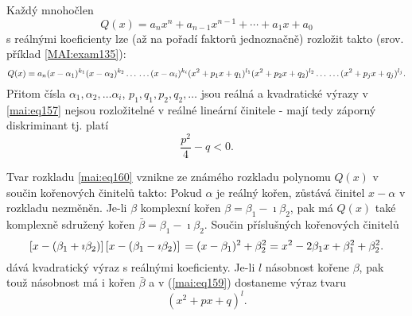       \begin{mdframed}[style=mdmathlemma] 
        \begin{lemma}\label{mai:lemma010}
          Každý mnohočlen
          \begin{equation*}
            Q(x) = a_nx^n + a_{n-1}x^{n-1} + \cdots + a_1x + a_0
          \end{equation*}
          s reálnými koeficienty lze (až na pořadí faktorů jednoznačně) rozložit takto (srov.
          příklad \ref{MAI:exam135}):
          \begin{equation}\label{mai:eq159}
            Q(x) = a_n(x-\alpha_1)^{k_1}(x-\alpha_2)^{k_2}\ldots                   \nonumber \\
            \ldots(x-\alpha_i)^{k_i}(x^2+p_1x+q_1)^{l_1}(x^2+p_2x+q_2)^{l_2}\ldots \nonumber \\ 
            \ldots(x^2+p_jx+q_j)^{l_j}.
          \end{equation}
          Přitom čísla \(\alpha_1, \alpha_2, \ldots \alpha_i\), \(p_1, q_1, p_2, q_2, \ldots \) jsou
          reálná a kvadratické výrazy v \ref{mai:eq157} nejsou rozložitelné v reálné lineární
          činitele - mají tedy záporný diskriminant tj. platí
          \begin{equation}\label{mai:eq160}
            \frac{p^2}{4}-q<0.
          \end{equation} 
        \end{lemma}
      \end{mdframed}

      Tvar rozkladu \ref{mai:eq160} vznikne ze známého rozkladu polynomu \(Q(x)\) v součin
      kořenových činitelů takto: Pokud \(\alpha\) je reálný kořen, zůstává činitel \(x-\alpha\) v
      rozkladu nezměněn. Je-li \(\beta\) komplexní kořen \(\beta = \beta_1-\imath\beta_2\), pak má
      \(Q(x)\) také komplexně sdružený kořen \(\bar{\beta} = \beta_1-\imath\beta_2\). Součin
      příslušných kořenových činitelů
      \begin{equation}\label{mai:eq161}
        \left[x-(\beta_1+\imath\beta_2)\right]  
        \left[x-(\beta_1-\imath\beta_2)\right]                             \nonumber \\
        = (x-\beta_1)^2+\beta^2_2 = x^2-2\beta_1x + \beta^2_1+\beta^2_2. 
      \end{equation}
      dává kvadratický výraz s reálnými koeficienty. Je-li \(l\) násobnost kořene \(\beta\), pak
      touž násobnost má i kořen \(\bar{\beta}\) a v (\ref{mai:eq159}) dostaneme výraz tvaru
      \begin{equation*}
        (x^2+px+q)^l.
      \end{equation*}

